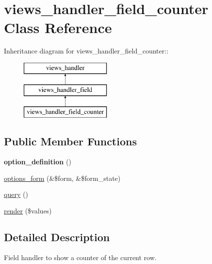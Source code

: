 \hypertarget{classviews__handler__field__counter}{
\section{views\_\-handler\_\-field\_\-counter Class Reference}
\label{classviews__handler__field__counter}
}
Inheritance diagram for views\_\-handler\_\-field\_\-counter::\begin{figure}[H]
\begin{center}
\leavevmode
\includegraphics[height=3cm]{classviews__handler__field__counter}
\end{center}
\end{figure}
\subsection*{Public Member Functions}
\begin{DoxyCompactItemize}
\item 
\hypertarget{classviews__handler__field__counter_aa54ee2a1667b6c6b1899d9ca929825be}{
{\bfseries option\_\-definition} ()}
\label{classviews__handler__field__counter_aa54ee2a1667b6c6b1899d9ca929825be}

\item 
\hyperlink{classviews__handler__field__counter_af2b34cb062b976874ba84d690293bafc}{options\_\-form} (\&\$form, \&\$form\_\-state)
\item 
\hyperlink{classviews__handler__field__counter_a32bdc9416672906d950f7ba73cc5bbaa}{query} ()
\item 
\hyperlink{classviews__handler__field__counter_af046da8114cbb0ddcc888a305a1676e2}{render} (\$values)
\end{DoxyCompactItemize}


\subsection{Detailed Description}
Field handler to show a counter of the current row. 

